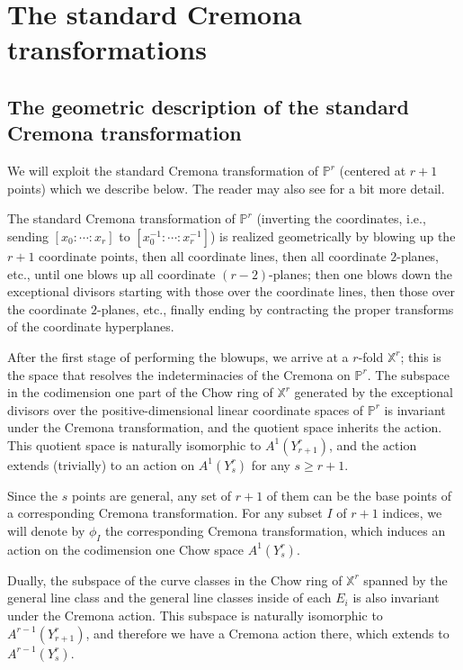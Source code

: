 \documentclass[12pt]{article}
\numberwithin{equation}{section}
\numberwithin{equation}{section}
\numberwithin{subeq}{equation}
\def\bbP{\mathbb{P}}
\def\bbX{\mathbb{X}}
\begin{document}
\section{The standard Cremona transformations}\label{cremona section}

\subsection{The geometric description of the standard Cremona transformation}
We will exploit the standard Cremona transformation of $\bbP^r$
(centered at $r+1$ points) which we describe below.
The reader may also see \cite{DM2} for a bit more detail.

The standard Cremona transformation of $\bbP^r$
(inverting the coordinates,
i.e., sending $[x_0:\cdots:x_r]$ to $[x_0^{-1}:\cdots:x_r^{-1}]$)
is realized geometrically by blowing up the $r+1$ coordinate points,
then all coordinate lines, then all coordinate $2$-planes, etc., until one blows up all coordinate $(r-2)$-planes;
then one blows down the exceptional divisors starting with those over the coordinate lines,
then those over the coordinate $2$-planes, etc.,
finally ending by contracting the proper transforms of the coordinate hyperplanes.

After the first stage of performing the blowups, we arrive at a $r$-fold $\bbX^r$;
this is the space that resolves the indeterminacies of the Cremona on $\bbP^r$.
The subspace in the codimension one part of the Chow ring of $\bbX^r$
generated by the exceptional divisors over the positive-dimensional linear coordinate spaces of $\bbP^r$
is invariant under the Cremona transformation,
and the quotient space inherits the action.
This quotient space is naturally isomorphic to $A^1(Y^r_{r+1})$,
and the action extends (trivially) to an action on $A^1(Y^r_s)$ for any $s \geq r+1$.

Since the $s$ points are general, any set of $r+1$ of them
can be the base points of a corresponding Cremona transformation.
For any subset $I$ of $r+1$ indices,
we will denote by $\phi_I$ the corresponding Cremona transformation,
which induces an action on the codimension one Chow space $A^1(Y^r_s)$.

Dually, the subspace of the curve classes in the Chow ring of $\bbX^r$
spanned by the general line class and the general line classes inside of each $E_i$
is also invariant under the Cremona action.
This subspace is naturally isomorphic to $A^{r-1}(Y^r_{r+1})$,
and therefore we have a Cremona action there, which extends to $A^{r-1}(Y^r_s)$.
\end{document}
